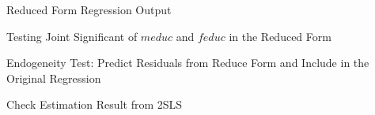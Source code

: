 Reduced Form Regression Output
\begin{stlog}\end{stlog}
Testing Joint Significant of $meduc$ and $feduc$ in the Reduced Form
\begin{stlog}\end{stlog}
Endogeneity Test: Predict Residuals from Reduce Form and Include in the Original Regression
\begin{stlog}\end{stlog}
Check Estimation Result from 2SLS
\begin{stlog}\end{stlog}
